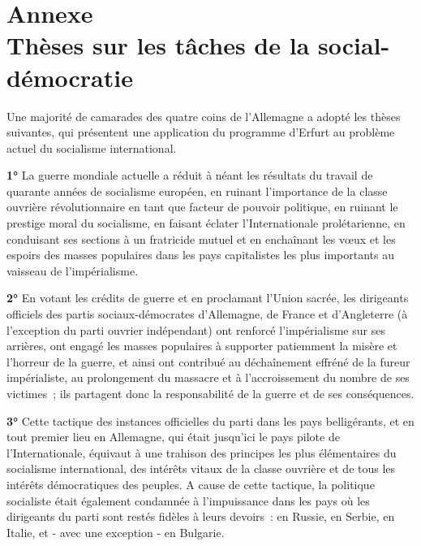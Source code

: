 \documentclass[french,twoside]{book} %
\def\mednobreak{\ifdim\lastskip<\medskipamount
  \removelastskip\nopagebreak\medskip\fi}
\newcommand{\labelblock}[1]{\medbreak{\noindent\color{rubric}\bfseries #1}\par\mednobreak}
\begin{document}
\labelblock{Prolétaires de tous les pays, unissez-vous !}

\section[{Annexe. Thèses sur les tâches de la social-démocratie}]{Annexe \\
Thèses sur les tâches de la social-démocratie}\renewcommand{\leftmark}{Annexe \\
Thèses sur les tâches de la social-démocratie}

\noindent Une majorité de camarades des quatre coins de l’Allemagne a adopté les thèses suivantes, qui présentent une application du programme d’Erfurt au problème actuel du socialisme international.\par
\textbf{1°} La guerre mondiale actuelle a réduit à néant les résultats du travail de quarante années de socialisme européen, en ruinant l’importance de la classe ouvrière révolutionnaire en tant que facteur de pouvoir politique, en ruinant le prestige moral du socialisme, en faisant éclater l’Internationale prolétarienne, en conduisant ses sections à un fratricide mutuel et en enchaînant les vœux et les espoirs des masses populaires dans les pays capitalistes les plus importants au vaisseau de l’impérialisme.\par
\textbf{2°} En votant les crédits de guerre et en proclamant l’Union sacrée, les dirigeants officiels des partis sociaux-démocrates d’Allemagne, de France et d’Angleterre (à l’exception du parti ouvrier indépendant) ont renforcé l’impérialisme sur ses arrières, ont engagé les masses populaires à supporter patiemment la misère et l’horreur de la guerre, et ainsi ont contribué au déchaînement effréné de la fureur impérialiste, au prolongement du massacre et à l’accroissement du nombre de ses victimes ; ils partagent donc la responsabilité de la guerre et de ses conséquences.\par
\textbf{3°} Cette tactique des instances officielles du parti dans les pays belligérants, et en tout premier lieu en Allemagne, qui était jusqu’ici le pays pilote de l’Internationale, équivaut à une trahison des principes les plus élémentaires du socialisme international, des intérêts vitaux de la classe ouvrière et de tous les intérêts démocratiques des peuples. A cause de cette tactique, la politique socialiste était également condamnée à l’impuissance dans les pays où les dirigeants du parti sont restés fidèles à leurs devoirs : en Russie, en Serbie, en Italie, et - avec une exception - en Bulgarie.\par
\end{document}
